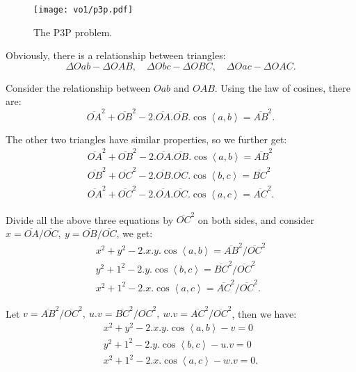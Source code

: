\begin{figure}[!ht]
	\centering
	\texttt{[image: vo1/p3p.pdf]}
	\caption{The P3P problem.}
	\label{fig:p3p}
\end{figure}

Obviously, there is a relationship between triangles:
\begin{equation}
\Delta Oab - \Delta OAB, \quad \Delta Obc - \Delta OBC, \quad \Delta Oac - \Delta OAC.
\end{equation}

Consider the relationship between $Oab$ and $OAB$. Using the law of cosines, there are:
\begin{equation}
\overline{OA}^2 + \overline{OB}^2 - 2.\overline{OA}.\overline{OB}.\cos \left\langle a,b \right \rangle  = \overline{AB}^2.
\end{equation}

The other two triangles have similar properties, so we further get:
\begin{equation}
\begin{array}{l}
\overline{OA}^2 + \overline{OB}^2 - 2.\overline{OA}.\overline{OB}.\cos \left\langle a,b \right \rangle  = \overline{AB}^2\\
\overline{OB}^2 + \overline{OC}^2 - 2.\overline{OB}.\overline{OC}.\cos \left\langle b,c \right \rangle  = \overline{BC}^2\\
\overline{OA}^2 + \overline{OC}^2 - 2.\overline{OA}.\overline{OC}.\cos \left\langle a,c \right \rangle  = \overline{AC}^2.
\end{array}
\end{equation}

Divide all the above three equations by $\overline{OC}^2$ on both sides, and consider $x=\overline{OA}/\overline{OC},\ y=\overline{OB}/\overline{OC}$, we get:
\begin{equation}
\begin{array}{l}
{x^2} + {y^2} - 2.x.y.\cos \left\langle a,b \right \rangle  = \overline{AB}^2/\overline{OC}^2\\
{y^2} + {1^2} - 2.y.\cos \left\langle b,c \right \rangle  = \overline{BC}^2/\overline{OC}^2\\
{x^2} + {1^2} - 2.x.\cos \left\langle a,c \right \rangle  = \overline{AC}^2/\overline{OC}^2.
\end{array}
\end{equation}

Let $v = \overline{AB}^2/\overline{OC}^2,\ u.v = \overline{BC}^2/\overline{OC}^2,\ w.v = \overline{AC}^2/\overline{OC}^2$, then we have:
\begin{equation}
\begin{array}{l}
{x^2} + {y^2} - 2.x.y.\cos \left\langle a,b \right \rangle  - v = 0\\
{y^2} + {1^2} - 2.y.\cos \left\langle b,c \right \rangle  - u.v = 0\\
{x^2} + {1^2} - 2.x.\cos \left\langle a,c \right \rangle  - w.v = 0.
\end{array}
\end{equation}

